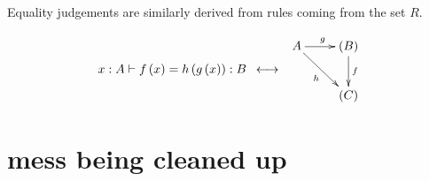 \documentclass[pra,floatfix,
amsmath,superscriptaddress, 12pt]{article}
\theoremstyle{definition}
\begin{document}
Equality judgements are similarly derived from rules coming from the set $R$.

\[
    x:A\vdash f\left(x\right)=h\left(g\left(x\right)\right):B \, \, \,
        \longleftrightarrow \, \, \,
            \vcenter{
                \vbox{
                    \xymatrix{
                        A
                        \ar[r]^{g}
                        \ar[dr]_{h}
                            &
                            (B)
                            \ar[d]^{f}
                                \\
                            &
                                \left( C \right)}}}
\]

\section{mess being cleaned up}
\end{document}
